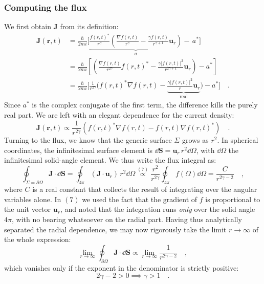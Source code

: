 \subsubsection{Computing the flux}
We first obtain $\bm{J}$ from its definition:
\[
\begin{aligned}
        \bm{J}(\bm{r},t) &= \frac{\hbar}{2mi}\bigg[\underbrace{\frac{f(r,t)^*}{r^\gamma} \left( \frac{\nabla f(r,t)}{r^\gamma} - \frac{\gamma f(r,t)}{r^{\gamma+1}}\bm{u}_r \right)}_a - \, a^* \bigg] \\ &=  \frac{\hbar}{2mi}\left[\left( \frac{\nabla f(r,t)}{r^{2\gamma}} f(r,t)^* - \frac{\gamma|f(r,t)|^2}{r^{2\gamma+1}}\bm{u}_r \right) - a^*\right] \\
        &= \frac{\hbar}{2mi}\biggl[\frac{1}{r^{2\gamma}}\biggl( {f(r,t)^*}\nabla f(r,t) -  \underbrace{\frac{\gamma|f(r,t)|^2}{r}\bm{u}_r}_{\text{real}}\biggr) - a^*\biggr] \quad.
\end{aligned}
\]
Since $a^*$ is the complex conjugate of the first term, the difference kills the purely real part. We are left with an elegant dependence for the current density:
\[
    \bm{J}(\bm{r},t) \propto \frac{1}{r^{2\gamma}}\left({f(r,t)^*}\nabla f(r,t) - {f(r,t)}\nabla f(r,t)^*  \right) \quad.
\]
Turning to the flux, we know that the generic surface $\Sigma$ grows as $r^2$. In spherical coordinates, the infinitesimal surface element is $\dd{\bm{S}} = \bm{u}_r \, r^2 \dd{\Omega}$, with $\dd{\Omega}$ the infinitesimal solid-angle element. We thus write the flux integral as:
\begin{equation}
    \oint_{\Sigma = \partial \Omega} \bm{J} \cdot \dd{\bm{S}} = \oint_{4\pi} (\bm{J} \cdot \bm{u}_r) \, r^2 \dd{\Omega} \overset{(7)}{\propto} \frac{r^2}{r^{2\gamma}} \oint_{4\pi} f(\Omega) \dd{\Omega} = \frac{C}{r^{2\gamma - 2}} \quad,
\end{equation}
where $C$ is a real constant that collects the result of integrating over the angular variables alone. In $(7)$ we used the fact that the gradient of $f$ is proportional to the unit vector $\bm{u}_r$, and noted that the integration runs \emph{only} over the solid angle $4\pi$, with no bearing whatsoever on the radial part.
Having thus analytically separated the radial dependence, we may now rigorously take the limit $r \to \infty$ of the whole expression:
\[
    \lim_{r \to \infty} \oint_{\partial \Omega} \bm{J} \cdot \dd{\bm{S}} \propto \lim_{r \to \infty} \frac{1}{r^{2\gamma-2}} \quad,
\]
which vanishes only if the exponent in the denominator is strictly positive:
\begin{equation}
        2\gamma - 2 > 0 \implies \gamma > 1 \quad.
\end{equation}

